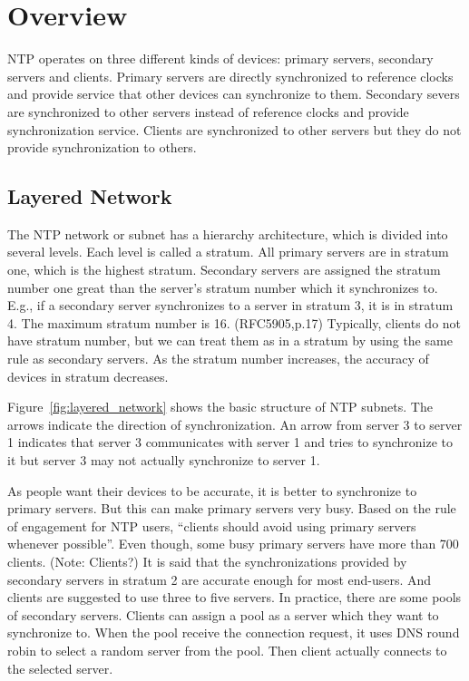 
\chapter{Overview}
NTP operates on three different kinds of devices: primary servers, secondary
servers and clients. Primary servers are directly synchronized to reference
clocks and provide service that other devices can synchronize to them.
Secondary severs are synchronized to other servers instead of reference clocks
and provide synchronization service. Clients are synchronized to other servers
but they do not provide synchronization to others.

\section{Layered Network}
\label{sec:Layered_network}
The NTP network or subnet has a hierarchy architecture, which is divided into
several levels. Each level is called a stratum. All primary servers are in
stratum one, which is the highest stratum. Secondary servers are assigned the
stratum number one great than the server's stratum number which it synchronizes
to. E.g., if a secondary server synchronizes to a server in stratum 3, it is in
stratum 4. The maximum stratum number is 16. (RFC5905,p.17)
Typically, clients do not have stratum number, but we can treat them
as in a stratum by using the same rule as secondary servers.
As the stratum number increases, the accuracy of devices in stratum
decreases.

Figure~\ref{fig:layered_network} shows the basic structure of NTP subnets. The
arrows indicate the direction of synchronization. An arrow from server 3 to
server 1 indicates that server 3 communicates with server 1 and tries to
synchronize to it but server 3 may not actually synchronize to server 1.



As people want their devices to be accurate, it is better to synchronize to
primary servers. But this can make primary servers very busy. Based on the rule
of engagement for NTP users, ``clients should avoid using primary servers
whenever possible''. Even though, some busy primary servers have more than 700
clients. (Note: Clients?)
It is said that the synchronizations provided by secondary servers in stratum 2
are accurate enough for most end-users. And clients are suggested to use three
to five servers. In practice, there are some pools of secondary servers.
Clients can assign a pool as a server which they want to synchronize to. When
the pool receive the connection request, it uses DNS round robin to select a
random server from the pool. Then client actually connects to the selected
server.

